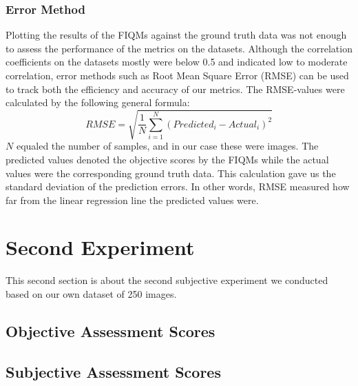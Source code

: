 \subsubsection{Error Method}
Plotting the results of the FIQMs against the ground truth data was not enough to assess the performance of the metrics on the datasets. Although the correlation coefficients on the datasets mostly were below 0.5 and indicated low to moderate correlation, error methods such as Root Mean Square Error (RMSE) can be used to track both the efficiency and accuracy of our metrics. The RMSE-values were calculated by the following general formula: 
\begin{equation}
    RMSE = \sqrt{\frac{1}{N}\sum _{i=1}^{N}(Predicted_{i} - Actual_{i})^2}
\end{equation}
$N$ equaled the number of samples, and in our case these were images. The predicted values denoted the objective scores by the FIQMs while the actual values were the corresponding ground truth data. This calculation gave us the standard deviation of the prediction errors. In other words, RMSE measured how far from the linear regression line the predicted values were. 
\newpage

\begin{table}[h]
\caption{The calculated RMSE values of the FIQMs on the datasets.}
\end{table}



\section{Second Experiment}
This second section is about the second subjective experiment we conducted based on our own dataset of 250 images. 
\subsection{Objective Assessment Scores}
\subsection{Subjective Assessment Scores}